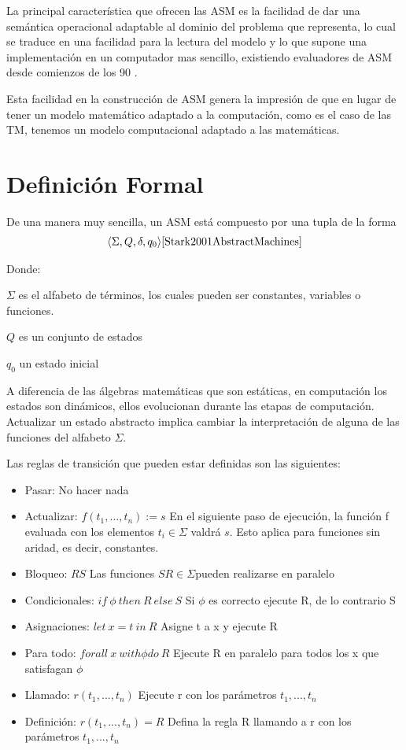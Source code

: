 \documentclass{article}
\begin{document}
La principal característica que ofrecen las ASM es la facilidad de dar una semántica operacional adaptable al dominio del problema que representa, lo cual se traduce en una facilidad para la lectura del modelo y lo que supone una implementación en un computador mas sencillo, existiendo evaluadores de ASM desde comienzos de los 90 \cite{Gurevich1991EVOLVINGSEMANTICS}.

Esta facilidad en la construcción de ASM genera la impresión de que en lugar de tener un modelo matemático adaptado a la computación, como es el caso de las TM, tenemos un modelo computacional adaptado a las matemáticas.

\section{Definición Formal}

De una manera muy sencilla, un ASM está compuesto por una tupla de la forma
\begin{align}

\langle \Sigma, Q, \delta, q_0\rangle \cite{Stark2001AbstractMachines}

\end{align}

Donde:

$ \Sigma $ es el alfabeto de términos, los cuales pueden ser constantes, variables o funciones.

$ Q $ es un conjunto de estados

$ q_0 $ un estado inicial

A diferencia de las álgebras matemáticas que son estáticas, en computación los estados son dinámicos, ellos evolucionan durante las etapas de computación. Actualizar un estado abstracto implica cambiar la interpretación de alguna de las funciones del alfabeto $ \Sigma $.

Las reglas de transición que pueden estar definidas son las siguientes:

\begin{itemize}
    \item Pasar: No hacer nada
    \item Actualizar: $ f(t_1,...,t_n):=s $ En el siguiente paso de ejecución, la función f evaluada con los elementos $ t_i \in \Sigma$ valdrá $s$. Esto aplica para funciones sin aridad, es decir, constantes.
    \item Bloqueo: $ R S $ Las funciones  $S R \in \Sigma $pueden realizarse en paralelo
    \item Condicionales: $if \ \phi \ then \  R \ else \ S $ Si $\phi$ es correcto ejecute R, de lo contrario S
    \item Asignaciones: $ let \ x = t \ in \ R $ Asigne t a x y ejecute R
    \item Para todo: $ forall \ x \ with \phi do \ R$ Ejecute R en paralelo para todos los x que satisfagan $ \phi $
    \item Llamado: $ r(t_1,...,t_n) $ Ejecute r con los parámetros $ t_1,...,t_n $
    \item Definición: $r(t_1,...,t_n) = R$ Defina la regla R llamando a r con los parámetros $ t_1,...,t_n$
\end{itemize}
\end{document}
